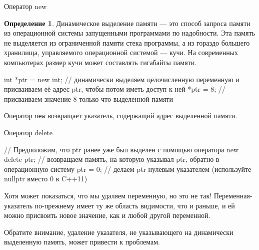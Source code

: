 \documentclass[
    9pt,
    hyperref={pdfencoding=unicode}
    ]{beamer}
\theoremstyle{definition}
\newtheorem{myDef}{Определение}
\begin{document}
\begin{frame}[fragile]{Оператор new}
    
    \begin{myDef}
        \alert{Динамическое выделение памяти} — это способ запроса памяти из операционной системы запущенными программами по надобности. Эта память не выделяется из ограниченной памяти стека программы, а из гораздо большего хранилища, управляемого операционной системой — \alert{кучи}. На современных компьютерах размер кучи может составлять гигабайты памяти.
    \end{myDef}
    
    \begin{cppcode}
        int *ptr = new int; // динамически выделяем целочисленную переменную и присваиваем её адрес ptr, чтобы потом иметь доступ к ней
        *ptr = 8; // присваиваем значение 8 только что выделенной памяти        
    \end{cppcode}

    Оператор \texttt{new} возвращает \alert{указатель}, содержащий адрес выделенной памяти.
\end{frame}

\begin{frame}[fragile]{Оператор delete}
    \begin{cppcode}
        // Предположим, что ptr ранее уже был выделен с помощью оператора new
        delete ptr; // возвращаем память, на которую указывал ptr, обратно в операционную систему
        ptr = 0; // делаем ptr нулевым указателем (используйте nullptr вместо 0 в C++11)
    \end{cppcode}
    Хотя может показаться, что мы удаляем переменную, но это не так! Переменная-указатель по-прежнему имеет ту же область видимости, что и раньше, и ей можно присвоить новое значение, как и любой другой переменной.
    
    Обратите внимание, удаление указателя, не указывающего на динамически выделенную память, может привести к проблемам.
\end{frame}
\end{document}
